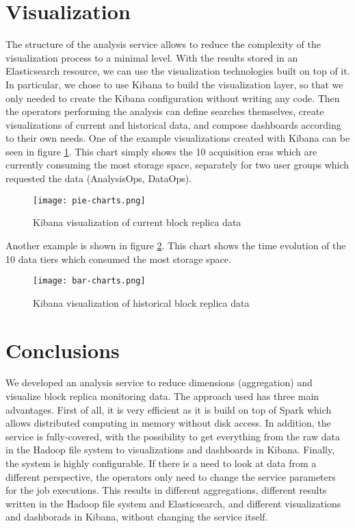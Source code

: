 \documentclass[a4paper]{jpconf}
\begin{document}
\section{Visualization}

The structure of the analysis service allows to reduce the complexity of the visualization process to a minimal level. With the results stored in an Elasticsearch resource, we can use the visualization technologies built on top of it. In particular, we chose to use Kibana \cite{Kibana} to build the visualization layer, so that we only needed to create the Kibana configuration without writing any code.
Then the operators performing the analysis can define searches themselves, create visualizations of current and historical data, and compose dashboards according to their own needs.
One of the example visualizations created with Kibana can be seen in figure \ref{fig:pie-charts}. This chart simply shows the 10 acquisition eras which are currently consuming the most storage space, separately for two user groups which requested the data (AnalysisOps, DataOps).

\begin{figure}[t]
\begin{center}
\texttt{[image: pie-charts.png]}\hspace{2pc}%
\caption{\label{fig:pie-charts}Kibana visualization of current block replica data}
\end{center}
\end{figure}

Another example is shown in figure \ref{fig:bar-charts}. This chart shows the time evolution of the 10 data tiers which consumed the most storage space.

\begin{figure}[t]
\begin{center}
\texttt{[image: bar-charts.png]}\hspace{2pc}%
\caption{\label{fig:bar-charts}Kibana visualization of historical block replica data}
\end{center}
\end{figure}

\section{Conclusions}

We developed an analysis service to reduce dimensions (aggregation) and visualize block replica monitoring data.
The approach used has three main advantages. First of all, it is very efficient as it is build on top of Spark which allows distributed computing in memory without disk access.
In addition, the service is fully-covered, with the possibility to get everything from the raw data in the Hadoop file system to visualizations and dashboards in Kibana.
Finally, the system is highly configurable. If there is a need to look at 
data from a different perspective, the operators only need to change the service parameters for the job executions. This results in different aggregations, different results written in the Hadoop file system and Elasticsearch, and different visualizations and dashborads in Kibana, without changing the service itself.
\end{document}
